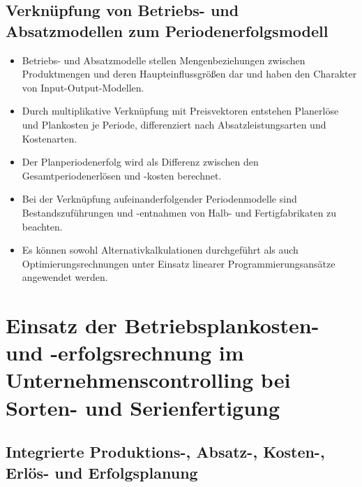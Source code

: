 \subsection{Verknüpfung von Betriebs- und Absatzmodellen zum Periodenerfolgsmodell}

\begin{itemize}
    \item Betriebs- und Absatzmodelle stellen Mengenbeziehungen zwischen Produktmengen und deren Haupteinflussgrö{\ss}en dar und haben den Charakter von Input-Output-Modellen.
    \item Durch multiplikative Verknüpfung mit Preisvektoren entstehen Planerlöse und Plankosten je Periode, differenziert nach Absatzleistungsarten und Kostenarten.
    \item Der Planperiodenerfolg wird als Differenz zwischen den Gesamtperiodenerlösen und -kosten berechnet.
    \item Bei der Verknüpfung aufeinanderfolgender Periodenmodelle sind Bestandszuführungen und -entnahmen von Halb- und Fertigfabrikaten zu beachten.
    \item Es können sowohl Alternativkalkulationen durchgeführt als auch Optimierungsrechnungen unter Einsatz linearer Programmierungsansätze angewendet werden.
\end{itemize}

\section{Einsatz der Betriebsplankosten- und -erfolgsrechnung im Unternehmenscontrolling bei Sorten- und Serienfertigung}

\subsection{Integrierte Produktions-, Absatz-, Kosten-, Erlös- und Erfolgsplanung}

